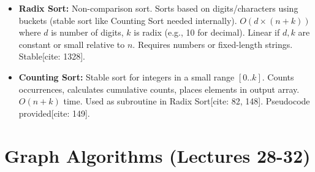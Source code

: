 \documentclass{article}
\begin{document}
\begin{itemize}
\begin{itemize}
          \end{itemize}
    \item \textbf{Radix Sort:} Non-comparison sort. Sorts based on digits/characters using buckets (stable sort like Counting Sort needed internally). $O(d \times (n+k))$ where $d$ is number of digits, $k$ is radix (e.g., 10 for decimal). Linear if $d, k$ are constant or small relative to $n$. Requires numbers or fixed-length strings. Stable[cite: 1328].
    \item \textbf{Counting Sort:} Stable sort for integers in a small range $[0..k]$. Counts occurrences, calculates cumulative counts, places elements in output array. $O(n+k)$ time. Used as subroutine in Radix Sort[cite: 82, 148]. Pseudocode provided[cite: 149].
\end{itemize}

\section{Graph Algorithms (Lectures 28-32)}
\end{document}

